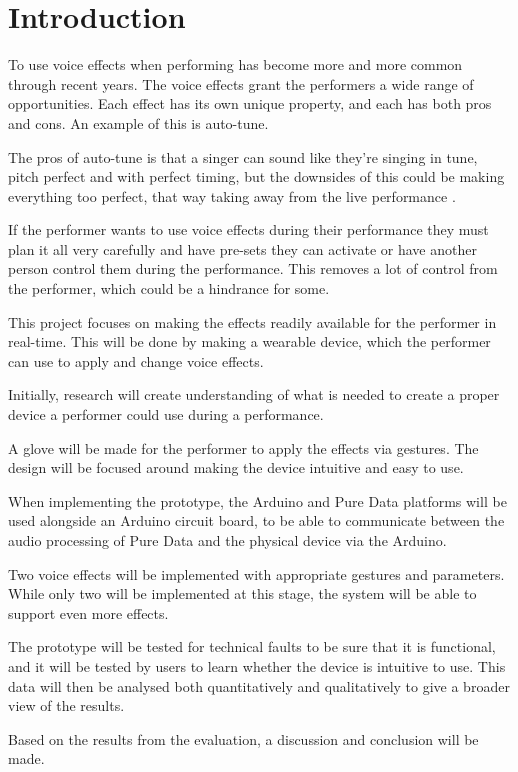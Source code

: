 \chapter{Introduction}\label{ch:Intro}

To use voice effects when performing has become more and more common through recent years. The voice effects grant the performers a wide range of opportunities. Each effect has its own unique property, and each has both pros and cons. An example of this is auto-tune.

The pros of auto-tune is that a singer can sound like they're singing in tune, pitch perfect and with perfect timing, but the downsides of this could be making everything too perfect, that way taking away from the live performance \citep{Tyrangiel_2009}.

If the performer wants to use voice effects during their performance they must plan it all very carefully and have pre-sets they can activate or have another person control them during the performance. This removes a lot of control from the performer, which could be a hindrance for some.

This project focuses on making the effects readily available for the performer in real-time. This will be done by making a wearable device, which the performer can use to apply and change voice effects.

Initially, research will create understanding of what is needed to create a proper device a performer could use during a performance.

A glove will be made for the performer to apply the effects via gestures. The design will be focused around making the device intuitive and easy to use.

When implementing the prototype, the Arduino and Pure Data platforms will be used alongside an Arduino circuit board, to be able to communicate between the audio processing of Pure Data and the physical device via the Arduino.

Two voice effects will be implemented with appropriate gestures and parameters. While only two will be implemented at this stage, the system will be able to support even more effects.

The prototype will be tested for technical faults to be sure that it is functional, and it will be tested by users to learn whether the device is intuitive to use. This data will then be analysed both quantitatively and qualitatively to give a broader view of the results. 

Based on the results from the evaluation, a discussion and conclusion will be made.


